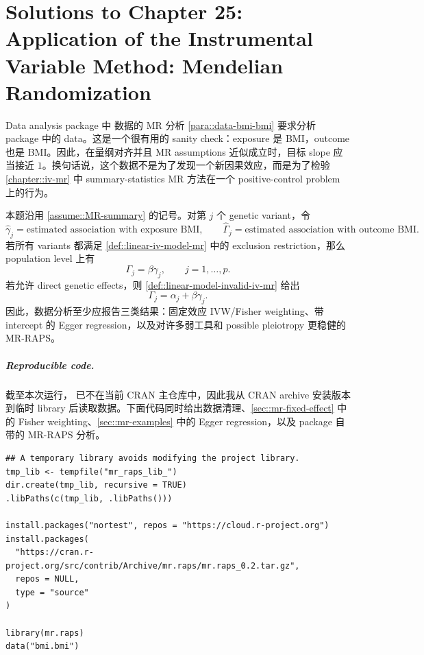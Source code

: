 \chapter{Solutions to Chapter 25: Application of the Instrumental Variable Method: Mendelian Randomization}
\label{sol:chapter25}

\begin{exercisesolution}{Data analysis}{ package 中  数据的 MR 分析}
\cref{para::data-bmi-bmi} 要求分析  package 中的  data。这是一个很有用的 sanity check：exposure 是 BMI，outcome 也是 BMI。因此，在量纲对齐并且 MR assumptions 近似成立时，目标 slope 应当接近 $1$。换句话说，这个数据不是为了发现一个新因果效应，而是为了检验 \cref{chapter::iv-mr} 中 summary-statistics MR 方法在一个 positive-control problem 上的行为。

本题沿用 \cref{assume::MR-summary} 的记号。对第 $j$ 个 genetic variant，令
\[
\hat{\gamma}_j=\text{estimated association with exposure BMI},
\qquad
\hat{\Gamma}_j=\text{estimated association with outcome BMI}.
\]
若所有 variants 都满足 \cref{def::linear-iv-model-mr} 中的 exclusion restriction，那么 population level 上有
\[
\Gamma_j=\beta\gamma_j,\qquad j=1,\ldots,p.
\]
若允许 direct genetic effects，则 \cref{def::linear-model-invalid-iv-mr} 给出
\[
\Gamma_j=\alpha_j+\beta\gamma_j.
\]
因此，数据分析至少应报告三类结果：固定效应 IVW/Fisher weighting、带 intercept 的 Egger regression，以及对许多弱工具和 possible pleiotropy 更稳健的 MR-RAPS。

\paragraph{Reproducible code.}
截至本次运行， 已不在当前 CRAN 主仓库中，因此我从 CRAN archive 安装版本  到临时 library 后读取数据。下面代码同时给出数据清理、\cref{sec::mr-fixed-effect} 中的 Fisher weighting、\cref{sec::mr-examples} 中的 Egger regression，以及 package 自带的 MR-RAPS 分析。

\begin{lstlisting}
## A temporary library avoids modifying the project library.
tmp_lib <- tempfile("mr_raps_lib_")
dir.create(tmp_lib, recursive = TRUE)
.libPaths(c(tmp_lib, .libPaths()))

install.packages("nortest", repos = "https://cloud.r-project.org")
install.packages(
  "https://cran.r-project.org/src/contrib/Archive/mr.raps/mr.raps_0.2.tar.gz",
  repos = NULL,
  type = "source"
)

library(mr.raps)
data("bmi.bmi")


\end{lstlisting}
\end{exercisesolution}
